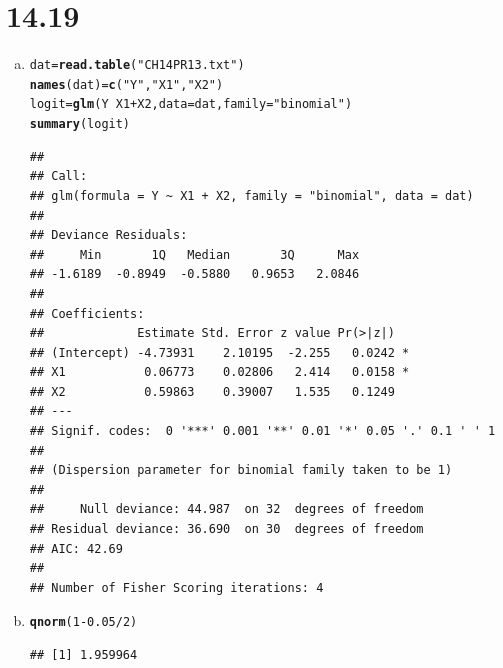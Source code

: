 \documentclass{article}\usepackage[]{graphicx}\usepackage[]{color}
\makeatletter
\newcommand{\hlnum}[1]{\textcolor[rgb]{0.686,0.059,0.569}{#1}}%
\newcommand{\hlstr}[1]{\textcolor[rgb]{0.192,0.494,0.8}{#1}}%
\newcommand{\hlopt}[1]{\textcolor[rgb]{0,0,0}{#1}}%
\newcommand{\hlstd}[1]{\textcolor[rgb]{0.345,0.345,0.345}{#1}}%
\newcommand{\hlkwb}[1]{\textcolor[rgb]{0.69,0.353,0.396}{#1}}%
\newcommand{\hlkwc}[1]{\textcolor[rgb]{0.333,0.667,0.333}{#1}}%
\newcommand{\hlkwd}[1]{\textcolor[rgb]{0.737,0.353,0.396}{\textbf{#1}}}%
\newenvironment{kframe}{%
 \def\at@end@of@kframe{}%
 \ifinner\ifhmode%
  \def\at@end@of@kframe{\end{minipage}}%
  \begin{minipage}{\columnwidth}%
 \fi\fi%
 \def\FrameCommand##1{\hskip\@totalleftmargin \hskip-\fboxsep
 \colorbox{shadecolor}{##1}\hskip-\fboxsep
     \hskip-\linewidth \hskip-\@totalleftmargin \hskip\columnwidth}%
 \MakeFramed {\advance\hsize-\width
   \@totalleftmargin\z@ \linewidth\hsize
   \@setminipage}}%
 {\par\unskip\endMakeFramed%
 \at@end@of@kframe}
\newenvironment{knitrout}{}{} %
\makeatother
\begin{document}
\section{14.19}

\begin{enumerate}[(a)]

\item

\begin{knitrout}
\color{fgcolor}\begin{kframe}
\begin{alltt}
  \hlstd{dat} \hlkwb{=} \hlkwd{read.table}\hlstd{(}\hlstr{"CH14PR13.txt"}\hlstd{)}
  \hlkwd{names}\hlstd{(dat)} \hlkwb{=} \hlkwd{c}\hlstd{(}\hlstr{"Y"}\hlstd{,} \hlstr{"X1"}\hlstd{,} \hlstr{"X2"}\hlstd{)}
  \hlstd{logit} \hlkwb{=} \hlkwd{glm}\hlstd{(Y} \hlopt{~} \hlstd{X1} \hlopt{+} \hlstd{X2,} \hlkwc{data} \hlstd{= dat,} \hlkwc{family} \hlstd{=} \hlstr{"binomial"}\hlstd{)}
  \hlkwd{summary}\hlstd{(logit)}
\end{alltt}
\begin{verbatim}
## 
## Call:
## glm(formula = Y ~ X1 + X2, family = "binomial", data = dat)
## 
## Deviance Residuals: 
##     Min       1Q   Median       3Q      Max  
## -1.6189  -0.8949  -0.5880   0.9653   2.0846  
## 
## Coefficients:
##             Estimate Std. Error z value Pr(>|z|)  
## (Intercept) -4.73931    2.10195  -2.255   0.0242 *
## X1           0.06773    0.02806   2.414   0.0158 *
## X2           0.59863    0.39007   1.535   0.1249  
## ---
## Signif. codes:  0 '***' 0.001 '**' 0.01 '*' 0.05 '.' 0.1 ' ' 1
## 
## (Dispersion parameter for binomial family taken to be 1)
## 
##     Null deviance: 44.987  on 32  degrees of freedom
## Residual deviance: 36.690  on 30  degrees of freedom
## AIC: 42.69
## 
## Number of Fisher Scoring iterations: 4
\end{verbatim}
\end{kframe}
\end{knitrout}

\item

\begin{knitrout}
\color{fgcolor}\begin{kframe}
\begin{alltt}
  \hlkwd{qnorm}\hlstd{(}\hlnum{1}\hlopt{-}\hlnum{0.05}\hlopt{/}\hlnum{2}\hlstd{)}
\end{alltt}
\begin{verbatim}
## [1] 1.959964
\end{verbatim}
\end{kframe}
\end{knitrout}


\end{enumerate}
\end{document}
